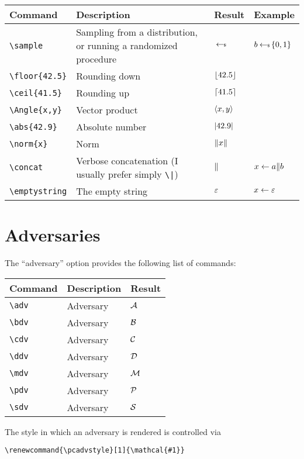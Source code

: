 \documentclass[a4paper]{report}
\begin{document}
\begin{center}
\begin{tabular}{l p{6cm} l l}
\textbf{Command} & \textbf{Description} & \textbf{Result} & \textbf{Example}  \\\hline
\lstinline$\sample$ & Sampling from a distribution, or running a randomized procedure & $\hskip2.3pt{\gets\!\!\mbox{\tiny${\$}$\normalsize}}\,$ & $b \hskip2.3pt{\gets\!\!\mbox{\tiny${\$}$\normalsize}}\, \{0,1\}$ \\
\lstinline$\floor{42.5}$ & Rounding down & $\left\lfloor 42.5\right\rfloor$ &  \\
\lstinline$\ceil{41.5}$ & Rounding up & $\left\lceil 41.5\right\rceil$ &  \\
\lstinline$\Angle{x,y}$ & Vector product & $\left\langle x,y\right\rangle$ &  \\
\lstinline$\abs{42.9}$ & Absolute number & $\left\lvert 42.9 \right\rvert$ &  \\
\lstinline$\norm{x}$ & Norm & $\left\|x\right\|$ & \\
\lstinline$\concat$ & Verbose concatenation (I usually prefer simply \lstinline$\|$) & $\|$ & $x \gets a\| b$ \\
\lstinline$\emptystring$ & The empty string & $\varepsilon$ & $x \gets \varepsilon$ 
\end{tabular}
\end{center}

\section{Adversaries}
The \enquote{adversary} option provides the following list of commands:

\begin{center}
\begin{tabular}{l l l}
\textbf{Command} & \textbf{Description} & \textbf{Result} \\\hline
\lstinline$\adv$ & Adversary & $\adv$  \\
\lstinline$\bdv$ & Adversary & $\bdv$  \\
\lstinline$\cdv$ & Adversary & $\cdv$  \\
\lstinline$\ddv$ & Adversary & $\ddv$  \\
\lstinline$\mdv$ & Adversary & $\mdv$  \\
\lstinline$\pdv$ & Adversary & $\pdv$  \\
\lstinline$\sdv$ & Adversary & $\sdv$  
\end{tabular}
\end{center}

The style in which an adversary is rendered is controlled via 
\begin{lstlisting}
\renewcommand{\pcadvstyle}[1]{\mathcal{#1}}
\end{lstlisting}
\end{document}
